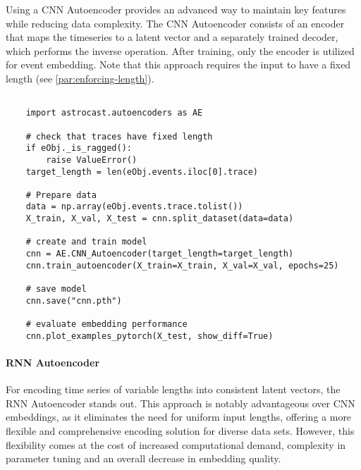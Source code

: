 Using a \ac{CNN} Autoencoder provides an advanced way to maintain key features while reducing data complexity. The CNN Autoencoder consists of an encoder that maps the timeseries to a latent vector and a separately trained decoder, which performs the inverse operation. After training, only the encoder is utilized for event embedding. Note that this approach requires the input to have a fixed length (see \ref{par:enforcing-length}).

\begin{lstlisting}[style=pyStyle]

    import astrocast.autoencoders as AE

    # check that traces have fixed length
    if eObj._is_ragged():
        raise ValueError()
    target_length = len(eObj.events.iloc[0].trace)

    # Prepare data
    data = np.array(eObj.events.trace.tolist())
    X_train, X_val, X_test = cnn.split_dataset(data=data)

    # create and train model
    cnn = AE.CNN_Autoencoder(target_length=target_length)
    cnn.train_autoencoder(X_train=X_train, X_val=X_val, epochs=25)

    # save model
    cnn.save("cnn.pth")

    # evaluate embedding performance
    cnn.plot_examples_pytorch(X_test, show_diff=True)

\end{lstlisting}

\paragraph{\ac{RNN} Autoencoder}

For encoding time series of variable lengths into consistent latent vectors, the \ac{RNN} Autoencoder stands out. This approach is notably advantageous over CNN embeddings, as it eliminates the need for uniform input lengths, offering a more flexible and comprehensive encoding solution for diverse data sets. However, this flexibility comes at the cost of increased computational demand, complexity in parameter tuning and an overall decrease in embedding quality.

